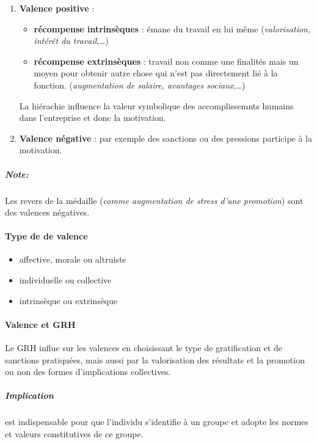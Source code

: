 \documentclass[11pt]{article} %
\begin{document}
\begin{enumerate}
    \item \textbf{Valence positive} :
        \begin{itemize}
           \item \textbf{récompense intrinsèques} : émane du travail en
               lui même (\textit{valorisation, intérêt du
               travail,\ldots})
           \item \textbf{récompense extrinsèques} : travail non comme
               une finalités mais un moyen pour obtenir autre chose qui
               n'est pas directement lié à la fonction.
               (\textit{augmentation de salaire, avantages
               sociaux,\ldots})
        \end{itemize}

        La hiérachie influence la valeur symbolique des accomplissemnts
        humains dans l'entreprise et donc la motivation.

    \item \textbf{Valence négative} : par exemple des sanctions ou des
        pressions participe à la motivation.
\end{enumerate}

\subparagraph{Note: } Les revers de la médaille (\textit{comme
augmentation de stress d'une promotion}) sont des valences négatives.

\paragraph{Type de de valence}

\begin{itemize}
    \item affective, morale ou altruiste
    \item individuelle ou collective
    \item intrinsèque ou extrinsèque
\end{itemize}

\paragraph{Valence et GRH}

Le GRH influe sur les valences en choisissant le type de gratification
et de sanctions pratiquées, mais aussi par la valorisation des
résultats et la promotion ou non des formes d'implications collectives.

\subparagraph{Implication} est indispensable pour que l'individu
s'identifie à un groupe et adopte les normes et valeurs constitutives de
ce groupe.
\end{document}
